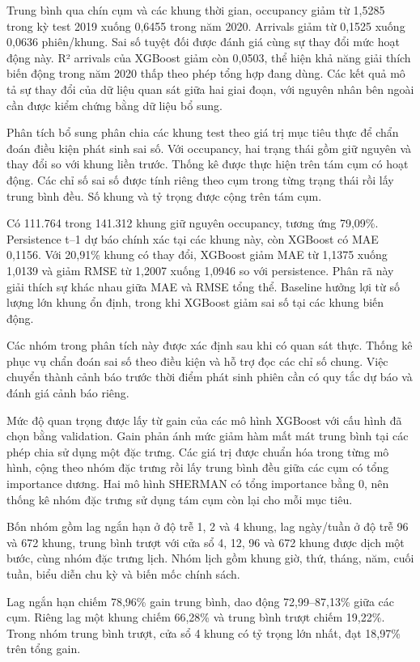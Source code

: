 \documentclass[conference,a4paper]{IEEEtran}
\begin{document}
Trung bình qua chín cụm và các khung thời gian, occupancy giảm từ 1,5285 trong kỳ test 2019 xuống 0,6455 trong năm 2020. Arrivals giảm từ 0,1525 xuống 0,0636 phiên/khung. Sai số tuyệt đối được đánh giá cùng sự thay đổi mức hoạt động này. R² arrivals của XGBoost giảm còn 0,0503, thể hiện khả năng giải thích biến động trong năm 2020 thấp theo phép tổng hợp đang dùng. Các kết quả mô tả sự thay đổi của dữ liệu quan sát giữa hai giai đoạn, với nguyên nhân bên ngoài cần được kiểm chứng bằng dữ liệu bổ sung.

Phân tích bổ sung phân chia các khung test theo giá trị mục tiêu thực để chẩn đoán điều kiện phát sinh sai số. Với occupancy, hai trạng thái gồm giữ nguyên và thay đổi so với khung liền trước. Thống kê được thực hiện trên tám cụm có hoạt động. Các chỉ số sai số được tính riêng theo cụm trong từng trạng thái rồi lấy trung bình đều. Số khung và tỷ trọng được cộng trên tám cụm.

Có 111.764 trong 141.312 khung giữ nguyên occupancy, tương ứng 79,09\%. Persistence t–1 dự báo chính xác tại các khung này, còn XGBoost có MAE 0,1156. Với 20,91\% khung có thay đổi, XGBoost giảm MAE từ 1,1375 xuống 1,0139 và giảm RMSE từ 1,2007 xuống 1,0946 so với persistence. Phân rã này giải thích sự khác nhau giữa MAE và RMSE tổng thể. Baseline hưởng lợi từ số lượng lớn khung ổn định, trong khi XGBoost giảm sai số tại các khung biến động.

Các nhóm trong phân tích này được xác định sau khi có quan sát thực. Thống kê phục vụ chẩn đoán sai số theo điều kiện và hỗ trợ đọc các chỉ số chung. Việc chuyển thành cảnh báo trước thời điểm phát sinh phiên cần có quy tắc dự báo và đánh giá cảnh báo riêng.

Mức độ quan trọng được lấy từ gain của các mô hình XGBoost với cấu hình đã chọn bằng validation. Gain phản ánh mức giảm hàm mất mát trung bình tại các phép chia sử dụng một đặc trưng. Các giá trị được chuẩn hóa trong từng mô hình, cộng theo nhóm đặc trưng rồi lấy trung bình đều giữa các cụm có tổng importance dương. Hai mô hình SHERMAN có tổng importance bằng 0, nên thống kê nhóm đặc trưng sử dụng tám cụm còn lại cho mỗi mục tiêu.

Bốn nhóm gồm lag ngắn hạn ở độ trễ 1, 2 và 4 khung, lag ngày/tuần ở độ trễ 96 và 672 khung, trung bình trượt với cửa sổ 4, 12, 96 và 672 khung được dịch một bước, cùng nhóm đặc trưng lịch. Nhóm lịch gồm khung giờ, thứ, tháng, năm, cuối tuần, biểu diễn chu kỳ và biến mốc chính sách.

Lag ngắn hạn chiếm 78,96\% gain trung bình, dao động 72,99–87,13\% giữa các cụm. Riêng lag một khung chiếm 66,28\% và trung bình trượt chiếm 19,22\%. Trong nhóm trung bình trượt, cửa sổ 4 khung có tỷ trọng lớn nhất, đạt 18,97\% trên tổng gain.
\end{document}
